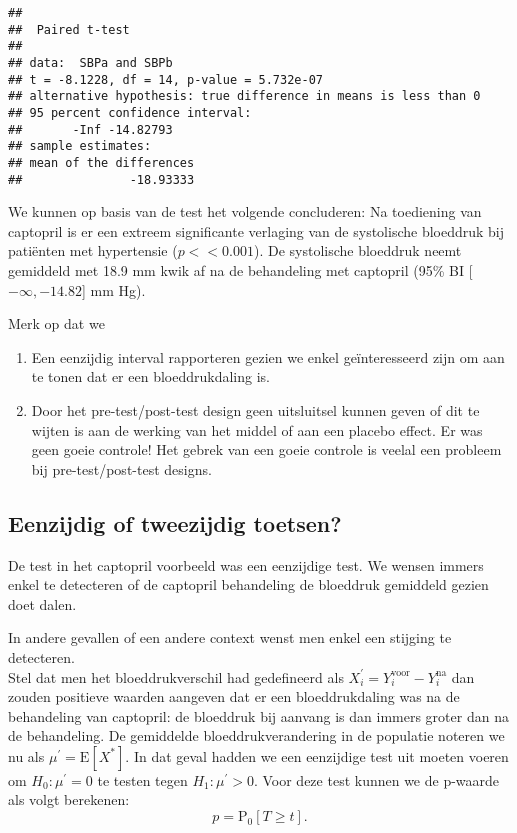 \documentclass[
  12pt,dutch,coursenotes]{book}
\providecommand{\tightlist}{%
  \setlength{\itemsep}{0pt}\setlength{\parskip}{0pt}}
\theoremstyle{definition}
\theoremstyle{definition}
\theoremstyle{definition}
\theoremstyle{remark}
\begin{document}
\begin{verbatim}
## 
## 	Paired t-test
## 
## data:  SBPa and SBPb
## t = -8.1228, df = 14, p-value = 5.732e-07
## alternative hypothesis: true difference in means is less than 0
## 95 percent confidence interval:
##       -Inf -14.82793
## sample estimates:
## mean of the differences 
##               -18.93333
\end{verbatim}

We kunnen op basis van de test het volgende concluderen:
Na toediening van captopril is er een extreem significante verlaging van de systolische bloeddruk bij patiënten met hypertensie
(\(p << 0.001\)). De systolische bloeddruk neemt gemiddeld met 18.9 mm kwik af na de behandeling met captopril (95\% BI {[}\(-\infty,-14.82\){]} mm Hg).

Merk op dat we

\begin{enumerate}
\def\labelenumi{\arabic{enumi}.}
\tightlist
\item
  Een eenzijdig interval rapporteren gezien we enkel geïnteresseerd zijn om aan te tonen dat er een bloeddrukdaling is.
\item
  Door het pre-test/post-test design geen uitsluitsel kunnen geven of dit te wijten is aan de werking van het middel of aan een placebo effect. Er was geen goeie controle! Het gebrek van een goeie controle is veelal een probleem bij pre-test/post-test designs.
\end{enumerate}

\hypertarget{eenzijdig-of-tweezijdig-toetsen}{%
\subsection{Eenzijdig of tweezijdig toetsen?}\label{eenzijdig-of-tweezijdig-toetsen}}

De test in het captopril voorbeeld was een eenzijdige test. We wensen immers enkel te detecteren of de captopril behandeling de bloeddruk gemiddeld gezien doet dalen.

In andere gevallen of een andere context wenst men enkel een stijging te detecteren.\\
Stel dat men het bloeddrukverschil had gedefineerd als \(X_{i}^\prime=Y_{i}^\text{voor}-Y_{i}^\text{na}\) dan zouden positieve waarden aangeven dat er een bloeddrukdaling was na de behandeling van captopril: de bloeddruk bij aanvang is dan immers groter dan na de behandeling.
De gemiddelde bloeddrukverandering in de populatie noteren we nu als \(\mu^\prime=\text{E}[X^*]\).
In dat geval hadden we een eenzijdige test uit moeten voeren om \(H_0: \mu^\prime=0\) te testen tegen \(H_1: \mu^\prime>0\).
Voor deze test kunnen we de p-waarde als volgt berekenen:
\[p=\text{P}_0\left[T\geq t\right].\]
\end{document}
